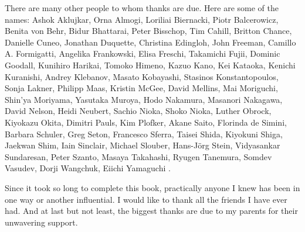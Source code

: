 There are many other people to whom thanks are due. Here are some of the names: 
Ashok Aklujkar,
Orna Almogi,
Loriliai Biernacki,
Piotr Balcerowicz,
Benita von Behr,
Bidur Bhattarai,
Peter Bisschop,
Tim Cahill,
Britton Chance\dag{},
Danielle Cuneo,
Jonathan Duquette,
Christina Edingloh,
John Freeman,
Camillo A. Formigatti,
Angelika Frankowski,
Elisa Freschi,
Takamichi Fujii,
Dominic Goodall,
Kunihiro Harikai,
Tomoko Himeno,
Kazuo Kano,
Kei Kataoka,
Kenichi Kuranishi,
Andrey Klebanov,
Masato Kobayashi,
Stasinos Konstantopoulos,
Sonja Lakner,
Philipp Maas,
Kristin McGee,
David Mellins,
Mai Moriguchi,
Shin'ya Moriyama,
Yasutaka Muroya,
Hodo Nakamura,
Masanori Nakagawa,
David Nelson, 
Heidi Neubert,
Sachio Nioka,
Shoko Nioka,
Luther Obrock,
Kiyokazu Okita,
Dimitri Pauls,
Kim Plofker,
Akane Saito,
Florinda de Simini,
Barbara Schuler,
Greg Seton,
Francesco Sferra,
Taisei Shida,
Kiyokuni Shiga,
Jae\-kwan Shim,
Iain Sinclair,
Michael Slouber,
Hans-Jörg Stein,
Vidyasankar Sundaresan,
Peter Szanto,
Masaya Takahashi,
Ryugen Tanemura,
Somdev Vasudev,
Dorji Wangchuk,
Eiichi Yamaguchi%
.


Since it took so long to complete this book, practically anyone I knew has been in one way or another influential. I would like to thank all the friends I have ever had. And at last but not least, the biggest thanks are due to my parents for their unwavering support.


